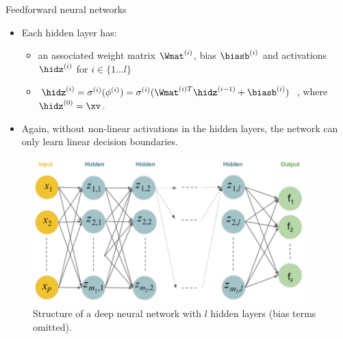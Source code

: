 \begin{vbframe}{Feedforward neural networks}
\begin{itemize}
    \vspace{5mm}
    \item Each hidden layer has: 
      \begin{itemize}
        \vspace{2mm}
        \item an associated weight matrix $\Wmat^{(i)}$, bias $\biasb^{(i)}$ and activations $\hidz^{(i)}$ for $i \in \{ 1 \ldots l\}$
        \vspace{2mm}
        \item $\hidz^{(i)} = \sigma^{(i)}(\phi^{(i)}) = \sigma^{(i)}(\Wmat^{(i)T}\hidz^{(i - 1)} + \biasb^{(i)})$ , where $\hidz^{(0)} = \xv$.
      \end{itemize}
    \vspace{5mm}
    \item Again, without non-linear activations in the hidden layers, the network can only learn linear decision boundaries.
  \end{itemize}
\framebreak
  \lz
  \begin{figure}
    \centering
      \includegraphics[width=10.5cm]{plots/deepneuralnet_new.png}
      \caption{Structure of a deep neural network with $l$ hidden layers (bias terms omitted).}
  \end{figure}
\end{vbframe}  

